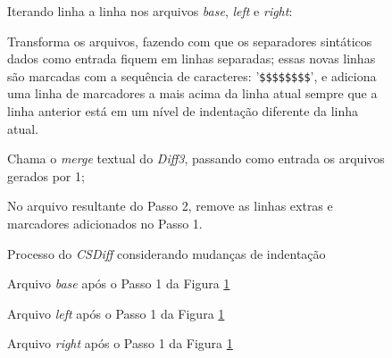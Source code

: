 \begin{figure}[ht]
	\begin{center}
		\begin{compactenum}[(1)]
			\item Iterando linha a linha nos arquivos \emph{base}, \emph{left} e \emph{right}:
			\begin{compactenum}
                \item Transforma os arquivos, fazendo com que os separadores
                    sintáticos dados como entrada fiquem em linhas separadas;
                    essas novas linhas são marcadas com a sequência de
                    caracteres: '\verb|$$$$$$$$|', e adiciona uma linha de
                    marcadores a mais acima da linha atual sempre que a linha
                    anterior está em um nível de indentação diferente da linha
                    atual.
			\end{compactenum}
            \item Chama o \emph{merge} textual do \emph{Diff3}, passando como
                entrada os arquivos gerados por 1;
            \item No arquivo resultante do Passo 2, remove as linhas extras e
                marcadores adicionados no Passo 1.
		\end{compactenum}
	\end{center}
	\caption{Processo do \emph{CSDiff} considerando mudanças de indentação}\label{csdiff_process_indentation}
\end{figure}

\begin{figure}[ht]
	\begin{center}
		
		\caption{Arquivo \emph{base} após o Passo 1 da Figura
			\ref{csdiff_process_indentation}}\label{base_marcadores_indentacao}
	\end{center}
\end{figure}

\begin{figure}[ht]
	\begin{center}
		
		\caption{Arquivo \emph{left} após o Passo 1 da Figura
			\ref{csdiff_process_indentation}}\label{left_marcadores_indentacao}
	\end{center}
\end{figure}

\begin{figure}[ht]
	\begin{center}
		
		\caption{Arquivo \emph{right} após o Passo 1 da Figura
			\ref{csdiff_process_indentation}}\label{right_marcadores_indentacao}
	\end{center}
\end{figure}

